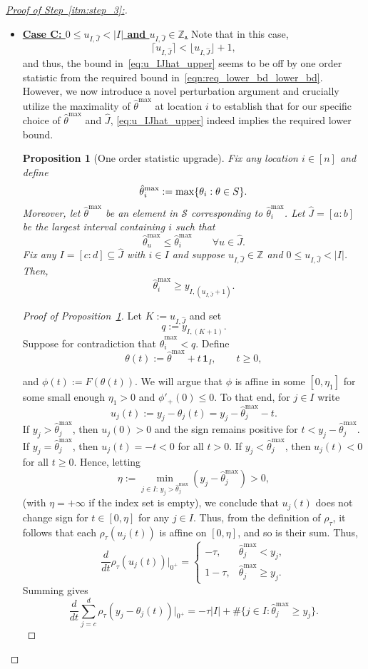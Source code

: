 \documentclass[11pt]{article}
\newcommand{\one}{\mathbf 1}
\newcommand{\cS}{\mathcal{S}}
\theoremstyle{plain}
\newtheorem{proposition}{Proposition}
\theoremstyle{definition}
\theoremstyle{remark}
\begin{document}
\begin{proof}[\underline{Proof of Step~\ref{itm:step_3}:}]
\begin{itemize}
\item \underline{\textbf{Case C: $0\le u_{I,\hat{J}}<|I|$ and $u_{I,\hat J}\in\mathbb Z$.}}
Note that in this case,
\[\lceil u_{I,\hat{J}}\rceil<\lfloor u_{I,\hat{J}}\rfloor+1,\]
and thus, the bound in~\eqref{eq:u_IJhat_upper} seems to be off by one order statistic from the required bound in~\eqref{eqn:req_lower_bd_lower_bd}. However, we now introduce a novel perturbation argument and crucially utilize the maximality of $\hat{\theta}^{\max}$ at location $i$ to establish that for our specific choice of $\hat{\theta}^{\max}$ and $\hat{J}$, \eqref{eq:u_IJhat_upper} indeed implies the required lower bound.
\begin{proposition}[One order statistic upgrade]\label{lem:perturb-upper}
 Fix any location $i \in [n]$ and define
    \[\hat\theta_i^{\max}:=\max\{\theta_i:\theta\in\mathcal \cS\}.\]
    Moreover, let $\hat{\theta}^{\max}$ be an element in $\cS$ corresponding to $\hat{\theta}^{\max}_i$.
Let $\hat{J}=[a:b]$ be the largest interval containing $i$ such that
\[
\hat\theta^{\max}_u \le \hat\theta^{\max}_i
\qquad \forall u\in \hat J.
\]
Fix any $I=[c:d]\subseteq \hat J$ with $i\in I$ and suppose
$u_{I,\hat J}\in\mathbb Z$ and $0\le u_{I,\hat J}<|I|$.
Then,
\[
\hat\theta_i^{\max}\ge y_{I,(u_{I,\hat J}+1)}.
\]
\end{proposition}
\begin{proof}[Proof of Proposition~\ref{lem:perturb-upper}]
Let $K:=u_{I,\hat J}$ and set
\[
q:=y_{I,(K+1)}.
\]
Suppose for contradiction that $\hat\theta_i^{\max}<q$.
Define
\begin{equation}\label{defn:theta_t}
    \theta(t):=\hat\theta^{\max}+t\,\one_I,\qquad t\ge 0,
\end{equation}

and $\phi(t):=F(\theta(t))$. We will argue that $\phi$ is affine in some $[0,\eta_1]$ for some small enough $\eta_1>0$ and $\phi'_{+}(0)\leq 0$. To that end, for $j\in I$ write
\[
u_j(t):=y_j-\theta_j(t)=y_j-\hat\theta^{\max}_j-t.
\]
If $y_j>\hat\theta^{\max}_j$, then $u_j(0)>0$ and the sign remains positive for
$t<y_j-\hat\theta^{\max}_j$.
If $y_j=\hat\theta^{\max}_j$, then $u_j(t)=-t<0$ for all $t>0$.
If $y_j<\hat\theta^{\max}_j$, then $u_j(t)<0$ for all $t\ge 0$.
Hence, letting
\[
\eta:=\min_{j\in I:\,y_j>\hat\theta^{\max}_j}
(y_j-\hat\theta^{\max}_j)>0,
\]
(with $\eta=+\infty$ if the index set is empty), we conclude that $u_j(t)$ does not change sign for $t\in [0,\eta]$ for any $j \in I.$ Thus, from the definition of $\rho_{\tau}$, it follows that each $\rho_\tau(u_j(t))$ is affine on $[0,\eta]$,
and so is their sum. Thus,
\[
\frac{d}{dt}\rho_\tau(u_j(t))\Big|_{0^+}
=
\begin{cases}
-\tau, & \hat\theta^{\max}_j<y_j,\\
1-\tau, & \hat\theta^{\max}_j\ge y_j.
\end{cases}
\]
Summing gives
\[
\frac{d}{dt}\sum_{j=c}^d \rho_\tau(y_j-\theta_j(t))\Big|_{0^+}
=
-\tau|I|+\#\{j\in I:\hat\theta^{\max}_j\ge y_j\}.
\]


\end{proof}
\end{itemize}
\end{proof}
\end{document}
